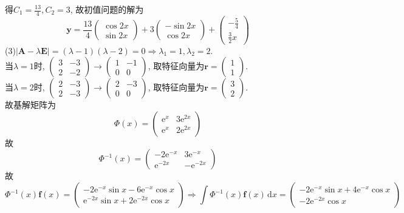 \documentclass[titlepage,11pt,a4paper,twoside]{report}
\makeatletter
\newcommand\diff{\,\mathrm{d}}
\newcommand\e{\mathrm{e}}
\newcommand\bmitPhi{\bm{\varPhi}}
\newenvironment{solve}{\par
	\pushQED{\qed}%
	\normalfont \topsep1\p@\@plus6\p@\relax
	\trivlist
	\item\relax
	{\hspace*{\parindent}{\heiti 解}\@addpunct{:}}\hspace\labelsep\ignorespaces
}{%
	\popQED\endtrivlist\@endpefalse
}
\makeatother
\begin{document}
\begin{solve}
得$C_1=\frac{13}{4},C_2=3$, 故初值问题的解为
\[\bm{y}=\frac{13}{4}\begin{pmatrix}\cos2x\\\sin2x\end{pmatrix}+3\begin{pmatrix}-\sin2x\\\cos2x\end{pmatrix}+\begin{pmatrix}-\frac{5}{4}\\\frac{3}{2}x\end{pmatrix}\]
(3)$|\bm{A}-\lambda\bm{E}|=(\lambda-1)(\lambda-2)=0\Rightarrow\lambda_1=1,\lambda_2=2$.\\
当$\lambda=1$时, $\begin{pmatrix}3&-3\\2&-2\end{pmatrix}\to\begin{pmatrix}1&-1\\0&0\end{pmatrix}$, 取特征向量为$\bm{r}=\begin{pmatrix}1\\1\end{pmatrix}$.\\
当$\lambda=2$时, $\begin{pmatrix}2&-3\\2&-3\end{pmatrix}\to\begin{pmatrix}2&-3\\0&0\end{pmatrix}$, 取特征向量为$\bm{r}=\begin{pmatrix}3\\2\end{pmatrix}$.\\
故基解矩阵为
\[\bmitPhi(x)=\begin{pmatrix}\e^x&3\e^{2x}\\\e^x&2\e^{2x}\end{pmatrix}\]
故\[\bmitPhi^{-1}(x)=\begin{pmatrix}-2\e^{-x}&3\e^{-x}\\\e^{-2x}&-\e^{-2x}\end{pmatrix}\]
故\[\bmitPhi^{-1}(x)\bm{f}(x)=\begin{pmatrix}-2\e^{-x}\sin x-6\e^{-x}\cos x\\\e^{-2x}\sin x+2\e^{-2x}\cos x\end{pmatrix}\Rightarrow\int\bmitPhi^{-1}(x)\bm{f}(x)\diff x=\begin{pmatrix}-2\e^{-x}\sin x+4\e^{-x}\cos x\\-2\e^{-2x}\cos x\end{pmatrix}\]

\end{solve}
\end{document}

